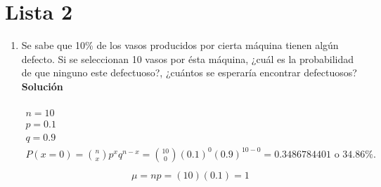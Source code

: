 \section{Lista 2}
\begin{enumerate}
	\item Se sabe que 10\% de los vasos producidos por cierta máquina tienen algún defecto. Si se seleccionan 10 vasos por ésta máquina, ¿cuál es la probabilidad de que ninguno este defectuoso?, ¿cuántos se esperaría encontrar defectuosos?
	\\\textbf{Solución}
	\\ \\
	\begin{gather*}
		n = 10 \\
		p = 0.1 \\
		q = 0.9 \\
		P(x = 0) = \binom{n}{x}p^xq^{n-x} = \binom{10}{0}(0.1)^0(0.9)^{10-0} = 0.3486784401 \text{ o 34.86\%.} \\
	\end{gather*}
	\begin{gather*}
		\mu = np = (10)(0.1) = 1
	\end{gather*}
	

\end{enumerate}
